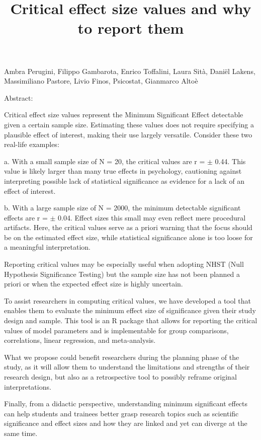 \documentclass{article}\usepackage[]{graphicx}\usepackage[]{xcolor}
\date{}
\begin{document}
\title{Critical effect size values and why to report them}
\maketitle

\begin{center}
Ambra Perugini, Filippo Gambarota, Enrico Toffalini, Laura Sità, Daniël Lakens, Massimiliano Pastore, Livio Finos, Psicostat, Gianmarco Altoè\\
\end{center}

\begin{large} 
  Abstract:\\
\end{large} 



Critical effect size values represent the Minimum Significant Effect detectable given a certain sample size. Estimating these values does not require specifying a plausible effect of interest, making their use largely versatile. Consider these two real-life examples:

a. With a small sample size of N = 20, the critical values are r = $\pm$ 0.44. This value is likely larger than many true effects in psychology, cautioning against interpreting possible lack of statistical significance as evidence for a lack of an effect of interest.

b. With a large sample size of N = 2000, the minimum detectable significant effects are r = $\pm$ 0.04. Effect sizes this small may even reflect mere procedural artifacts. Here, the critical values serve as a priori warning that the focus should be on the estimated effect size, while statistical significance alone is too loose for a meaningful interpretation.

Reporting critical values may be especially useful when adopting NHST (Null Hypothesis Significance Testing) but the sample size has not been planned a priori or when the expected effect size is highly uncertain.

To assist researchers in computing critical values, we have developed a tool that enables them to evaluate the minimum effect size of significance given their study design and sample. This tool is an R package that allows for reporting the critical values of model parameters and is implementable for group comparisons, correlations, linear regression, and meta-analysis.

What we propose could benefit researchers during the planning phase of the study, as it will allow them to understand the limitations and strengths of their research design, but also as a retrospective tool to possibly reframe original interpretations.

Finally, from a didactic perspective, understanding minimum significant effects can help students and trainees better grasp research topics such as scientific significance and effect sizes and how they are linked and yet can diverge at the same time.
\end{document}
